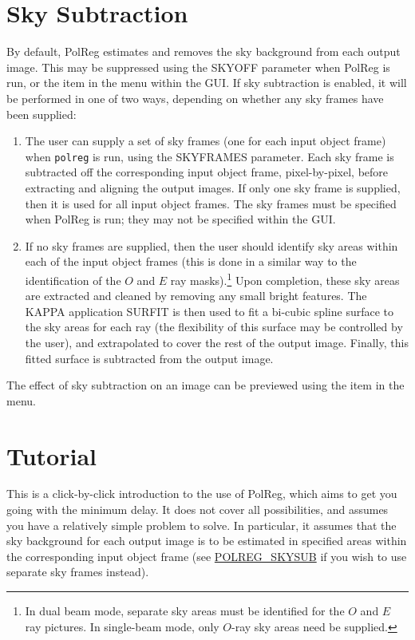 \section {Sky Subtraction}
By default, PolReg estimates and removes the sky background from each
output image. This may be suppressed using the SKYOFF parameter when
PolReg is run, or the  
item in the  menu
within the GUI. If sky subtraction is enabled, it will be performed in
one of two ways, depending on whether any sky frames have been supplied:

\begin{enumerate}

\item The user can supply a set of sky frames (one for each input object
frame) when {\tt polreg} is run, using the SKYFRAMES parameter. Each sky
frame is subtracted off the corresponding input object frame,
pixel-by-pixel, before extracting and aligning the output images. If only
one sky frame is supplied, then it is used for all input object frames.
The sky frames must be specified when PolReg is run; they may not be
specified within the GUI.

\item If no sky frames are supplied, then the user should identify sky areas
within each of the input object frames (this is done in a similar way to
the identification of the $O$ and $E$ ray masks).\footnote{In dual beam
mode, separate sky areas must be identified for the $O$ and $E$ ray
pictures. In single-beam mode, only $O$-ray sky areas need be supplied.}
Upon completion, these sky areas are extracted and cleaned by removing
any small bright features. The KAPPA application SURFIT is then used to
fit a bi-cubic spline surface to the sky areas for each ray (the
flexibility of this surface may be controlled by the user), and
extrapolated to cover the rest of the output image. Finally, this fitted
surface is subtracted from the output image.

\end{enumerate}

The effect of sky subtraction on an image can be previewed using the
 item in the 
 menu.

\section {Tutorial}
This is a click-by-click introduction to the use of PolReg, which aims to
get you going with the minimum delay. It does not cover all possibilities,
and assumes you have a relatively simple problem to solve. In particular, 
it assumes that the sky background for each output image is to be
estimated in specified areas within the corresponding input object frame
(see \hyperref{here}{section }{}{POLREG_SKYSUB} if you wish to use
separate sky frames instead).

